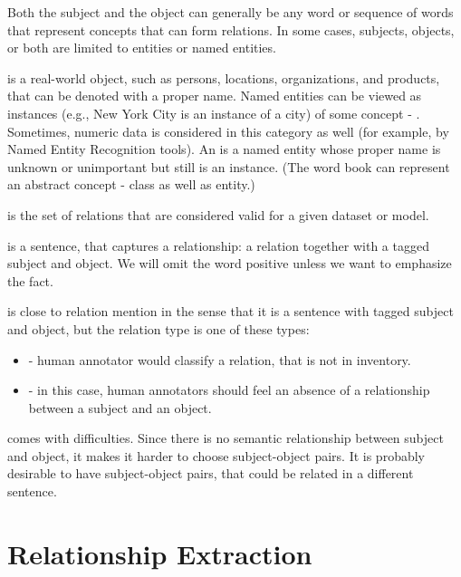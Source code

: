 Both the subject and the object can generally be any word or sequence of words that represent concepts that can form relations. In some cases, subjects, objects, or both are limited to entities or named entities.

 is a real-world object, such as persons, locations, organizations, and products, that can be denoted with a proper name. Named entities can be viewed as instances (e.g., New York City is an instance of a city) of some concept - . Sometimes, numeric data is considered in this category as well (for example, by Named Entity Recognition tools). An  is a named entity whose proper name is unknown or unimportant but still is an instance. (The word book can represent an abstract concept - class as well as entity.) 

 is the set of relations that are considered valid for a given dataset or model.

 is a sentence, that captures a relationship: a relation together with a tagged subject and object. We will omit the word positive unless we want to emphasize the fact.

 is close to relation mention in the sense that it is a sentence with tagged subject and object, but the relation type is one of these types: 
\begin{itemize}
\item {} - human annotator would classify a relation, that is not in inventory.
\item {} - in this case, human annotators should feel an absence of a relationship between a subject and an object. 



\end{itemize}

 comes with difficulties. Since there is no semantic relationship between subject and object, it makes it harder to choose subject-object pairs. It is probably desirable to have subject-object pairs, that could be related in a different sentence.

 


\section{Relationship Extraction}

